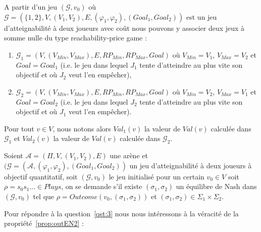 A partir d'un jeu $(\mathcal{G},v_{0})$ où $\mathcal{G} =( \{ 1, 2 \}, V, (V_{1},V_{2}), E, (\varphi _{1},\varphi _{2}),(Goal_{1},Goal_{2}))$ est un jeu d'atteignabilité à deux joueurs avec coût nous pouvons y associer deux jeux à somme nulle du type \og reachability-price game \fg:
\begin{enumerate}
	\item $\mathcal{G}_{1} = (V,(V_{Min},V_{Max}),E,RP_{Min},RP_{Max},Goal)$ où $V_{Min} = V_{1}$, $V_{Max} = V_{2}$ et $Goal = Goal_{1}$ (i.e. le jeu dans lequel $J_{1}$ tente d'atteindre au plus vite son objectif et où $J_{2}$ veut l'en empêcher),
	\item $\mathcal{G}_{2} = (V,(V_{Min},V_{Max}),E,RP_{Min},RP_{Max},Goal)$ où $V_{Min} = V_{2}$, $V_{Max} = V_{1}$ et $Goal = Goal_{2}$ (i.e. le jeu dans lequel $J_{2}$ tente d'atteindre au plus vite son objectif et où $J_{1}$ veut l'en empêcher).
\end{enumerate}

Pour tout $v \in V$, nous notons alors $Val_{1}(v)$ la valeur de $Val(v)$ calculée dans $\mathcal{G}_{1}$ et $Val_{2}(v)$ la valeur de $Val(v)$ calculée dans $\mathcal{G}_{2}$.

\begin{qst}
	
	\label{qst:3}
	
	Soient $\mathcal{A} = (\Pi, V, (V_{1}, V_{2}), E)$ une arène et $(\mathcal{G} = (\mathcal{A}, (\varphi _{1}, \varphi _{2}), (Goal_{1}, Goal_{2}))$ un jeu d'atteignabilité à deux joueurs à objectif quantitatif, soit $(\mathcal{G}, v_{0})$ le jeu initialisé pour un certain $v_{0} \in V $ soit $\rho = s_{0}s_{1}... \in Plays$, on se demande s'il existe $(\sigma _{1},\sigma _{2})$ un équilibre de Nash dans $(\mathcal{G},v_{0})$ tel que $\rho = Outcome(v_{0},(\sigma _{1},\sigma _{2}))$ et $(\sigma _{1},\sigma _{2}) \in \Sigma _{1} \times \Sigma _{2}.$
\end{qst}

Pour répondre à la question~\ref{qst:3} nous nous intéressons à la véracité de la propriété~\ref{prop:outEN2} :

